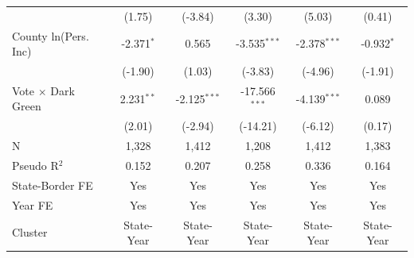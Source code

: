 \begin{tabular*}{\textwidth}{@{\extracolsep{\fill}}lccccc}
                             & (1.75)       & (-3.84)       & (3.30)         & (5.03)        & (0.41)\\   
   County ln(Pers. Inc)      & -2.371$^{*}$  & 0.565          & -3.535$^{***}$  & -2.378$^{***}$ & -0.932$^{*}$\\   
                             & (-1.90)      & (1.03)        & (-3.83)        & (-4.96)       & (-1.91)\\   
   Vote $\times$ Dark Green  & 2.231$^{**}$  & -2.125$^{***}$ & -17.566$^{***}$ & -4.139$^{***}$ & 0.089\\   
                             & (2.01)       & (-2.94)       & (-14.21)       & (-6.12)       & (0.17)\\   
   \hline
   N              & 1,328         & 1,412          & 1,208           & 1,412          & 1,383\\  
   Pseudo R$^2$              & 0.152         & 0.207          & 0.258           & 0.336          & 0.164\\  
   State-Border FE           & Yes           & Yes            & Yes             & Yes            & Yes\\  
   Year FE                   & Yes           & Yes            & Yes             & Yes            & Yes\\  
   Cluster              & State-Year & State-Year & State-Year & State-Year & State-Year\\  
   \bottomrule
\end{tabular*}
\par\endgroup
